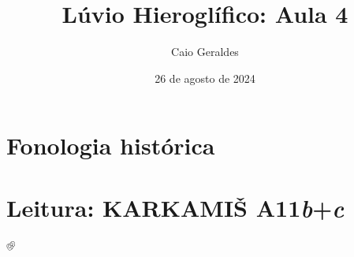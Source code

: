 \documentclass[article]{luvita}
\title{Lúvio Hieroglífico: Aula 4}
\author{Caio Geraldes}
\date{26 de agosto de 2024}
\begin{document}
\frontmatter

\mainmatter%

\maketitle


\chapter{Fonologia histórica}


\chapter{Leitura: KARKAMIŠ A11\emph{b}+\emph{c}}



\backmatter%

\printbibliography%

𔐀
\end{document}
